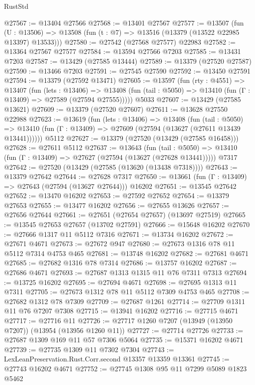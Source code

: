\begin{lexlean}{RustStd}
\begin{coremodule}
@27567 := @13404 @27566
@27568 := @13401 @27567
@27577 := @13507
    (fun (U : @13506) => @13508 (fun (t : @7) => @13516 (@13379 (@13522 @22985 @13397) @13533)))
@27580 := @27542 (@27568 @27577) @22983
@27582 := @13364 @27567 @27577
@27584 := @13594 @27566 @7203
@27585 := @13431 @7203
@27587 := @13429 (@27585 @13444)
@27589 := @13379 (@27520 @27587)
@27590 := @13466 @7203
@27591 := @27545 @27590
@27592 := @13450 @27591
@27594 := @13379 (@27592 @13471)
@27605 := @13597
    (fun (rty : @4551) =>
    @13407
      (fun (lets : @13406) =>
      @13408 (fun (tail : @5050) => @13410 (fun (Γ : @13409) => @27589 (@27594 @27555)))))
    @5033
@27607 := @13429 (@27585 @13621)
@27609 := @13379 (@27520 @27607)
@27611 := @13628 @27550 @22988
@27623 := @13619
    (fun (lets : @13406) =>
    @13408
      (fun (tail : @5050) =>
      @13410 (fun (Γ : @13409) => @27609 (@27594 (@13627 (@27611 @13439 @13441))))))
    @5112
@27627 := @13379 (@27520 (@13429 (@27585 @16458)))
@27628 := @27611 @5112
@27637 := @13643
    (fun (tail : @5050) => @13410 (fun (Γ : @13409) => @27627 (@27594 (@13627 (@27628 @13441)))))
    @7317
@27642 := @27520 (@13429 (@27585 (@13620 (@13438 @7318))))
@27643 := @13379 @27642
@27644 := @27628 @7317
@27650 := @13661 (fun (Γ : @13409) => @27643 (@27594 (@13627 @27644))) @16202
@27651 := @13545 @27642
@27652 := @13470 @16202
@27653 := @27592 @27652
@27654 := @13379 @27653
@27655 := @13477 @16202
@27656 := @27655 @13626
@27657 := @27656 @27644
@27661 := @27651 (@27654 @27657) (@13697 @27519)
@27665 := @13545 @27653 @27657 (@13702 @27591)
@27666 := @15648 @16202
@27670 := @27666 @1317 @11 @5112 @7316
@27671 := @13734 @16202
@27672 := @27671 @4671
@27673 := @27672 @947
@27680 := @27673 @1316 @78 @11 @5112 @7314 @4753 @465
@27681 := @13748 @16202
@27682 := @27681 @4671
@27685 := @27682 @1316 @78 @7314
@27686 := @13757 @16202
@27687 := @27686 @4671
@27693 := @27687 @1313 @1315 @11 @76 @7311 @7313
@27694 := @13725 @16202
@27695 := @27694 @4671
@27698 := @27695 @1313 @11 @7311
@27705 := @27673 @1312 @78 @11 @5112 @7309 @4753 @465
@27708 := @27682 @1312 @78 @7309
@27709 := @27687 @1261
@27714 := @27709 @1311 @11 @76 @7207 @7308
@27715 := @13941 @16202
@27716 := @27715 @4671
@27717 := @27716 @11
@27726 := @27717 @1260 @7207 (@13949 (@13950 @7207)) (@13954 (@13956 @1260 @11))
@27727 := @27714 @27726
@27733 := @27687 @1309 @169 @11 @57 @7306 @5064
@27735 := @15371 @16202 @4671
@27739 := @27735 @1309 @11 @7302 @7304
@27743 := LexLeanPreservation.Rust.Corr.second @13357 @13359 @13361
@27745 := @27743 @16202 @4671
@27752 := @27745 @1308 @95 @11 @7299 @5089 @1823 @5462

\end{coremodule}
\end{lexlean}
